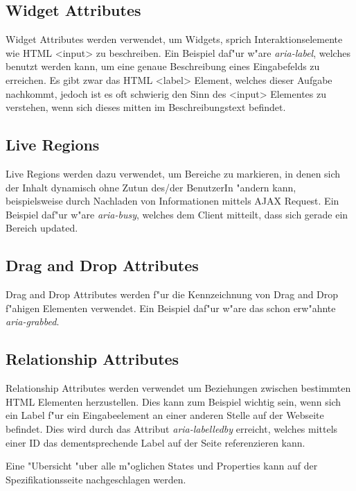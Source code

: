 \documentclass[a4paper,bibtotoc,oneside]{scrbook}
\begin{document}
\subsection{Widget Attributes}
Widget Attributes werden verwendet, um Widgets, sprich Interaktionselemente wie HTML <input> zu beschreiben. Ein Beispiel daf"ur w"are \emph{aria-label}, welches benutzt werden kann, um eine genaue Beschreibung eines Eingabefelds zu erreichen. Es gibt zwar das HTML <label> Element, welches dieser Aufgabe nachkommt, jedoch ist es oft schwierig den Sinn des <input> Elementes zu verstehen, wenn sich dieses mitten im Beschreibungstext befindet. \cite[Abschnitt 6.6, aria-label]{aria_states}

\subsection{Live Regions}
Live Regions werden dazu verwendet, um Bereiche zu markieren, in denen sich der Inhalt dynamisch ohne Zutun des/der BenutzerIn "andern kann, beispielsweise durch Nachladen von Informationen mittels AJAX Request. Ein Beispiel daf"ur w"are \emph{aria-busy}, welches dem Client mitteilt, dass sich gerade ein Bereich updated. \cite[Abschnitt 6.6, aria-busy]{aria_states}

\subsection{Drag and Drop Attributes}
Drag and Drop Attributes werden f"ur die Kennzeichnung von Drag and Drop f"ahigen Elementen verwendet. Ein Beispiel daf"ur w"are das schon erw"ahnte \emph{aria-grabbed}. \cite[Abschnitt 6.6, aria-grabbed]{aria_states}

\subsection{Relationship Attributes}
Relationship Attributes werden verwendet um Beziehungen zwischen bestimmten HTML Elementen herzustellen. Dies kann zum Beispiel wichtig sein, wenn sich ein Label f"ur ein Eingabeelement an einer anderen Stelle auf der Webseite befindet. Dies wird durch das Attribut \emph{aria-labelledby} erreicht, welches mittels einer ID das dementsprechende Label auf der Seite referenzieren kann. \cite[Abschnitt 6.6, aria-labelledby]{aria_states}

Eine "Ubersicht "uber alle m"oglichen States und Properties kann auf der Spezifikationsseite nachgeschlagen werden. \cite[Abschnitt 6.6]{aria_states}
\end{document}
